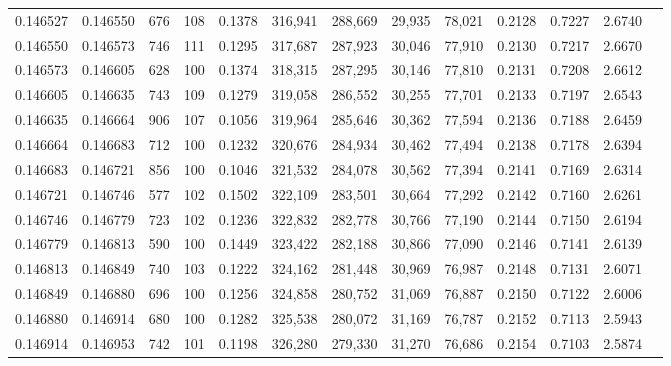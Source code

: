 \begin{tabular}{rrrrrrrrrrrrr}
0.146527 & 0.146550 &   676 & 108 &                                     0.1378 & 316,941 & 288,669 &  29,935 &  78,021 & 0.2128 & 0.7227 & 2.6740 \\
0.146550 & 0.146573 &   746 & 111 &                                     0.1295 & 317,687 & 287,923 &  30,046 &  77,910 & 0.2130 & 0.7217 & 2.6670 \\
0.146573 & 0.146605 &   628 & 100 &                                     0.1374 & 318,315 & 287,295 &  30,146 &  77,810 & 0.2131 & 0.7208 & 2.6612 \\
0.146605 & 0.146635 &   743 & 109 &                                     0.1279 & 319,058 & 286,552 &  30,255 &  77,701 & 0.2133 & 0.7197 & 2.6543 \\
0.146635 & 0.146664 &   906 & 107 &                                     0.1056 & 319,964 & 285,646 &  30,362 &  77,594 & 0.2136 & 0.7188 & 2.6459 \\
0.146664 & 0.146683 &   712 & 100 &                                     0.1232 & 320,676 & 284,934 &  30,462 &  77,494 & 0.2138 & 0.7178 & 2.6394 \\
0.146683 & 0.146721 &   856 & 100 &                                     0.1046 & 321,532 & 284,078 &  30,562 &  77,394 & 0.2141 & 0.7169 & 2.6314 \\
0.146721 & 0.146746 &   577 & 102 &                                     0.1502 & 322,109 & 283,501 &  30,664 &  77,292 & 0.2142 & 0.7160 & 2.6261 \\
0.146746 & 0.146779 &   723 & 102 &                                     0.1236 & 322,832 & 282,778 &  30,766 &  77,190 & 0.2144 & 0.7150 & 2.6194 \\
0.146779 & 0.146813 &   590 & 100 &                                     0.1449 & 323,422 & 282,188 &  30,866 &  77,090 & 0.2146 & 0.7141 & 2.6139 \\
0.146813 & 0.146849 &   740 & 103 &                                     0.1222 & 324,162 & 281,448 &  30,969 &  76,987 & 0.2148 & 0.7131 & 2.6071 \\
0.146849 & 0.146880 &   696 & 100 &                                     0.1256 & 324,858 & 280,752 &  31,069 &  76,887 & 0.2150 & 0.7122 & 2.6006 \\
0.146880 & 0.146914 &   680 & 100 &                                     0.1282 & 325,538 & 280,072 &  31,169 &  76,787 & 0.2152 & 0.7113 & 2.5943 \\
0.146914 & 0.146953 &   742 & 101 &                                     0.1198 & 326,280 & 279,330 &  31,270 &  76,686 & 0.2154 & 0.7103 & 2.5874 \\

\end{tabular}
